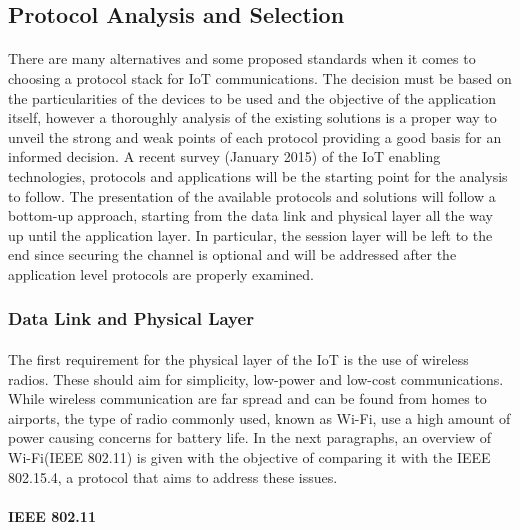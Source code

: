 \subsection{Protocol Analysis and Selection}

\paragraph{}
There are many alternatives and some proposed standards when it comes to choosing a protocol stack for \ac{IoT} communications. The decision must be based on the particularities of the devices to be used and the objective of the application itself, however a thoroughly analysis of the existing solutions is a proper way to unveil the strong and weak points of each protocol providing a good basis for an informed decision. A recent survey (January 2015) \cite{Al-Fuqaha2015} of the \ac{IoT} enabling technologies, protocols and applications will be the starting point for the analysis to follow. The presentation of the available protocols and solutions will follow a bottom-up approach, starting from the data link and physical layer all the way up until the application layer. In particular, the session layer will be left to the end since securing the channel is optional and will be addressed after the application level protocols are properly examined.

\subsubsection{Data Link and Physical Layer}

\paragraph{}
The first requirement for the physical layer of the \ac{IoT} is the use of wireless radios. These should aim for simplicity, low-power and low-cost communications. While wireless communication are far spread and can be found from homes to airports, the type of radio commonly used, known as Wi-Fi, use a high amount of power causing concerns for battery life. In the next paragraphs, an overview of Wi-Fi(IEEE 802.11) is given with the objective of comparing it with the IEEE 802.15.4, a protocol that aims to address these issues.

\paragraph{\textbf{IEEE 802.11}}
